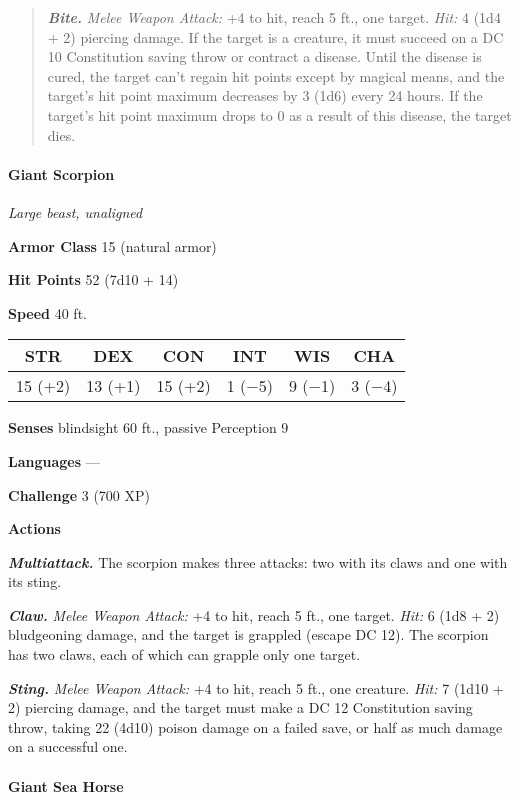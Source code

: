 \documentclass[
]{article}
\begin{document}
\begin{quote}
\emph{\textbf{Bite.}} \emph{Melee Weapon Attack:} +4 to hit, reach 5
ft., one target. \emph{Hit:} 4 (1d4 + 2) piercing damage. If the target
is a creature, it must succeed on a DC 10 Constitution saving throw or
contract a disease. Until the disease is cured, the target can't regain
hit points except by magical means, and the target's hit point maximum
decreases by 3 (1d6) every 24 hours. If the target's hit point maximum
drops to 0 as a result of this disease, the target dies.
\end{quote}

\hypertarget{giant-scorpion}{%
\paragraph{Giant Scorpion}\label{giant-scorpion}}

\emph{Large beast, unaligned}

\textbf{Armor Class} 15 (natural armor)

\textbf{Hit Points} 52 (7d10 + 14)

\textbf{Speed} 40 ft.

\begin{longtable}[]{@{}cccccc@{}}
\toprule
STR & DEX & CON & INT & WIS & CHA\tabularnewline
\midrule
\endhead
15 (+2) & 13 (+1) & 15 (+2) & 1 (−5) & 9 (−1) & 3 (−4)\tabularnewline
\bottomrule
\end{longtable}

\textbf{Senses} blindsight 60 ft., passive Perception 9

\textbf{Languages} ---

\textbf{Challenge} 3 (700 XP)

\textbf{Actions}

\emph{\textbf{Multiattack.}} The scorpion makes three attacks: two with
its claws and one with its sting.

\emph{\textbf{Claw.}} \emph{Melee Weapon Attack:} +4 to hit, reach 5
ft., one target. \emph{Hit:} 6 (1d8 + 2) bludgeoning damage, and the
target is grappled (escape DC 12). The scorpion has two claws, each of
which can grapple only one target.

\emph{\textbf{Sting.}} \emph{Melee Weapon Attack:} +4 to hit, reach 5
ft., one creature. \emph{Hit:} 7 (1d10 + 2) piercing damage, and the
target must make a DC 12 Constitution saving throw, taking 22 (4d10)
poison damage on a failed save, or half as much damage on a successful
one.

\hypertarget{giant-sea-horse}{%
\paragraph{Giant Sea Horse}\label{giant-sea-horse}}
\end{document}
